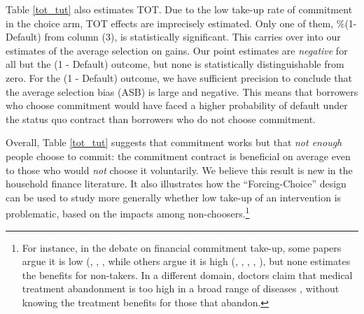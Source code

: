 \documentclass[12pt, a4paper]{article}
\begin{document}
Table \ref{tot_tut} also estimates TOT. Due to the low take-up rate of commitment in the choice arm, TOT effects are imprecisely estimated. Only one of them, \%(1-Default) from column (3), is statistically significant. 
This carries over into our estimates of the average selection on gains. Our point estimates are \emph{negative} for all but the (1 - Default) outcome, but none is statistically distinguishable from zero.  
For the (1 - Default) outcome, we have sufficient precision to conclude that the average selection bias (ASB) is large and negative.
This means that borrowers who choose commitment would have faced a higher probability of default under the status quo contract than borrowers who do not choose commitment.%


Overall, Table \ref{tot_tut} suggests that commitment works but that \emph{not enough} people choose to commit: the commitment contract is beneficial on average even to those who would \emph{not} choose it voluntarily. We believe this result is new in the household finance literature. It also illustrates how the ``Forcing-Choice'' design can be used to study more generally whether low take-up of an intervention is problematic, based on the impacts among non-choosers.\footnote{For instance, in the debate on financial commitment take-up, some papers argue it is low (\cite{Ashraf}, \cite{Gine}, \cite{Ted}, \cite{Royer} while others argue it is high (\cite{Kremer}, \cite{Casaburi}, \cite{Alcohol}, \cite{AprajitP&P}, \cite{Pascaline}), but none estimates the benefits for non-takers. In a different domain, doctors claim that medical treatment abandonment is too high in a broad range of diseases \citep{non_adherence}, without knowing the treatment benefits for those that abandon.}
\end{document}
